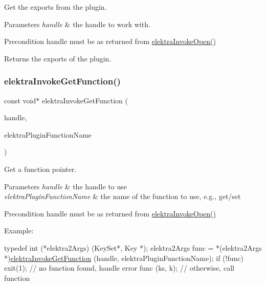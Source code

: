 Get the exports from the plugin. 


\begin{DoxyParams}{Parameters}
{\em handle} & the handle to work with.\\
\hline
\end{DoxyParams}
\begin{DoxyPrecond}{Precondition}
handle must be as returned from \hyperlink{group__invoke_ga3fd9791ecf43c0dde08a2fc1f02db6bc}{elektra\+Invoke\+Open()}
\end{DoxyPrecond}
\begin{DoxyReturn}{Returns}
the exports of the plugin. 
\end{DoxyReturn}
\mbox{\label{group__invoke_ga4531a643a71a63c19c94d87bd8d0b40f}} 
\subsubsection{\texorpdfstring{elektra\+Invoke\+Get\+Function()}{elektraInvokeGetFunction()}}
{\footnotesize\ttfamily const void$\ast$ elektra\+Invoke\+Get\+Function (\begin{DoxyParamCaption}\item[{Elektra\+Invoke\+Handle $\ast$}]{handle,  }\item[{const char $\ast$}]{elektra\+Plugin\+Function\+Name }\end{DoxyParamCaption})}



Get a function pointer. 


\begin{DoxyParams}{Parameters}
{\em handle} & the handle to use \\
\hline
{\em elektra\+Plugin\+Function\+Name} & the name of the function to use, e.\+g., get/set\\
\hline
\end{DoxyParams}
\begin{DoxyPrecond}{Precondition}
handle must be as returned from \hyperlink{group__invoke_ga3fd9791ecf43c0dde08a2fc1f02db6bc}{elektra\+Invoke\+Open()}
\end{DoxyPrecond}
Example\+:


\begin{DoxyCode}
\textcolor{keyword}{typedef} int (*elektra2Args) (KeySet*, Key *);
elektra2Args func = *(elektra2Args *)\hyperlink{group__invoke_ga4531a643a71a63c19c94d87bd8d0b40f}{elektraInvokeGetFunction} (handle, 
      elektraPluginFunctionName);
\textcolor{keywordflow}{if} (!func) exit(1);   \textcolor{comment}{// no function found, handle error}
func (ks, k);         \textcolor{comment}{// otherwise, call function}
\end{DoxyCode}


